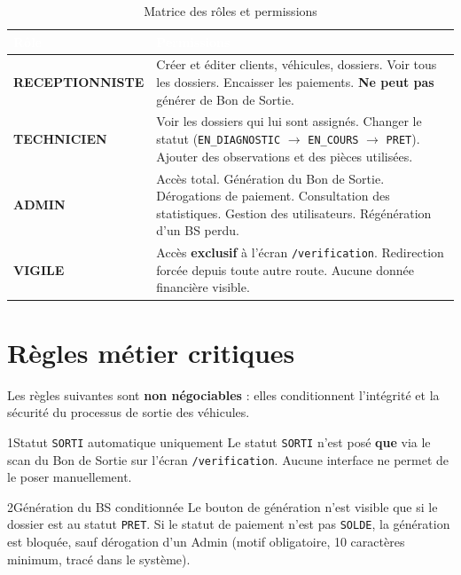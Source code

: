 \documentclass[11pt,a4paper]{report}
\begin{document}
\begin{table}[h!]
\centering
{}
\begin{tabularx}{\linewidth}{@{}l>{\raggedright\arraybackslash}X@{}}
\toprule
\rowcolor{km0blue}
\textcolor{white}{\textbf{Rôle}} & \textcolor{white}{\textbf{Permissions}} \\
\midrule
\textbf{RECEPTIONNISTE} & Créer et éditer clients, véhicules, dossiers. Voir tous les dossiers.
Encaisser les paiements. \textbf{Ne peut pas} générer de Bon de Sortie. \\
\textbf{TECHNICIEN} & Voir les dossiers qui lui sont assignés. Changer le statut
(\texttt{EN\_DIAGNOSTIC} $\rightarrow$ \texttt{EN\_COURS} $\rightarrow$ \texttt{PRET}).
Ajouter des observations et des pièces utilisées. \\
\textbf{ADMIN} & Accès total. Génération du Bon de Sortie. Dérogations de paiement.
Consultation des statistiques. Gestion des utilisateurs. Régénération d'un BS perdu. \\
\textbf{VIGILE} & Accès \textbf{exclusif} à l'écran \texttt{/verification}. Redirection forcée
depuis toute autre route. Aucune donnée financière visible. \\
\bottomrule
\end{tabularx}
\caption{Matrice des rôles et permissions}
\end{table}

\chapter{Règles métier critiques}
\label{ch:regles}

Les règles suivantes sont \textbf{non négociables} : elles conditionnent l'intégrité et la
sécurité du processus de sortie des véhicules.

\begin{regle}{1}{Statut \texttt{SORTI} automatique uniquement}
Le statut \texttt{SORTI} n'est posé \textbf{que} via le scan du Bon de Sortie sur l'écran
\texttt{/verification}. Aucune interface ne permet de le poser manuellement.
\end{regle}

\begin{regle}{2}{Génération du BS conditionnée}
Le bouton de génération n'est visible que si le dossier est au statut \texttt{PRET}.
Si le statut de paiement n'est pas \texttt{SOLDE}, la génération est bloquée, sauf
dérogation d'un Admin (motif obligatoire, 10 caractères minimum, tracé dans le système).
\end{regle}
\end{document}
